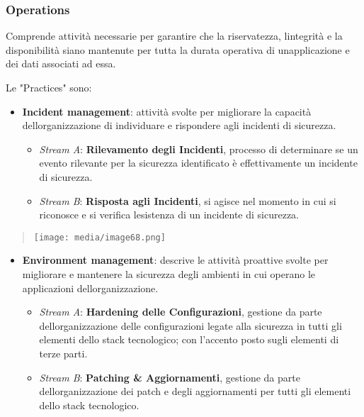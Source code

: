 \subsubsection{Operations}\label{operations}

Comprende attività necessarie per garantire che la riservatezza,
l\textquotesingle integrità e la disponibilità siano mantenute per tutta
la durata operativa di un\textquotesingle applicazione e dei dati
associati ad essa.

Le "Practices" sono:

\begin{itemize}
\item
  \textbf{Incident management}: attività svolte per migliorare la
  capacità dell\textquotesingle organizzazione di individuare e
  rispondere agli incidenti di sicurezza.

  \begin{itemize}
  \item
    \emph{Stream A}: \textbf{Rilevamento degli Incidenti}, processo di
    determinare se un evento rilevante per la sicurezza identificato è
    effettivamente un incidente di sicurezza.
  \item
    \emph{Stream B}: \textbf{Risposta agli Incidenti}, si agisce nel
    momento in cui si riconosce e si verifica
    l\textquotesingle esistenza di un incidente di sicurezza.
  \end{itemize}
\end{itemize}

\begin{quote}
\texttt{[image: media/image68.png]}
\end{quote}

\begin{itemize}
\item
  \textbf{Environment management}: descrive le attività proattive svolte
  per migliorare e mantenere la sicurezza degli ambienti in cui operano
  le applicazioni dell\textquotesingle organizzazione.

  \begin{itemize}
  \item
    \emph{Stream A}: \textbf{Hardening delle Configurazioni}, gestione
    da parte dell\textquotesingle organizzazione delle configurazioni
    legate alla sicurezza in tutti gli elementi dello stack tecnologico;
    con l'accento posto sugli elementi di terze parti.
  \item
    \emph{Stream B}: \textbf{Patching \& Aggiornamenti}, gestione da
    parte dell\textquotesingle organizzazione dei patch e degli
    aggiornamenti per tutti gli elementi dello stack tecnologico.
  \end{itemize}
\end{itemize}

